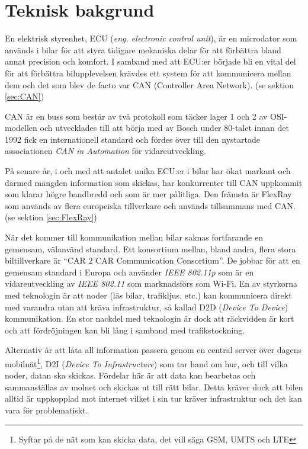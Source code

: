 \documentclass[a4paper]{IEEEtran}
\begin{document}
\section{Teknisk bakgrund}
En elektrisk styrenhet, ECU (\emph{eng. electronic control unit}), är en microdator som används i bilar för att styra tidigare mekaniska delar för att förbättra bland annat precision och komfort. 
I samband med att ECU:er började bli en vital del för att förbättra bilupplevelsen krävdes ett system för att kommunicera mellan dem och det som blev de facto var CAN (Controller Area Network). (se sektion \ref{sec:CAN})

CAN är en buss som består av två protokoll som täcker lager 1 och 2 av OSI-modellen och utvecklades till att börja med av Bosch under 80-talet innan det 1992 fick en internationell standard och fördes över till den nystartade associationen \emph{CAN in Automation} för vidareutveckling. \cite{CANhist}

På senare år, i och med att antalet unika ECU:er i bilar har ökat markant och därmed mängden information som skickas, har konkurrenter till CAN uppkommit som klarar högre bandbredd och som är mer pålitliga. Den främsta är FlexRay som används av flera europeiska tillverkare och används tillsammans med CAN. \cite{FlexRayWiki} (se sektion \ref{sec:FlexRay})

När det kommer till kommunikation mellan bilar saknas fortfarande en gemensam, välanvänd standard. Ett konsortium mellan, bland andra, flera stora biltillverkare är ``CAR 2 CAR Communication Consortium''. De jobbar för att en gemensam standard i Europa och använder \emph{IEEE 802.11p} som är en vidareutveckling av \emph{IEEE 802.11} som marknadsförs som Wi-Fi. En av styrkorna med teknologin är att noder (läs bilar, trafikljus, etc.) kan kommunicera direkt med varandra utan att kräva infrastruktur, så kallad D2D (\emph{Device To Device}) kommunikation. En stor nackdel med teknologin är dock att räckvidden är kort och att fördröjningen kan bli lång i samband med trafikstockning. \cite{C2COrg,C2CDepl,ericsson5G,5GPPP}

Alternativ är att låta all information passera genom en central server över dagens mobilnät\footnote{Syftar på de nät som kan skicka data, det vill säga GSM, UMTS och LTE}, D2I (\emph{Device To Infrastructure}) som tar hand om hur, och till vilka noder, datan ska skickas. Fördelar här är att data kan bearbetas och sammanställas av molnet och skickas ut till rätt bilar. Detta kräver dock att bilen alltid är uppkopplad mot internet vilket i sin tur kräver infrastruktur och det kan vara för problematiskt. \cite{VolvoSRA}
\end{document}

